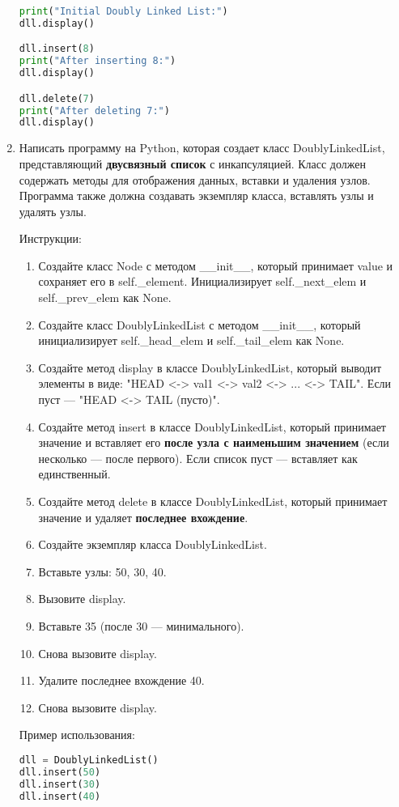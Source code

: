 \begin{enumerate}
\begin{lstlisting}[language=Python]
print("Initial Doubly Linked List:")
dll.display()

dll.insert(8)
print("After inserting 8:")
dll.display()

dll.delete(7)
print("After deleting 7:")
dll.display()
\end{lstlisting}

\item Написать программу на Python, которая создает класс DoublyLinkedList, представляющий \textbf{двусвязный список} с инкапсуляцией. Класс должен содержать методы для отображения данных, вставки и удаления узлов. Программа также должна создавать экземпляр класса, вставлять узлы и удалять узлы.

Инструкции:
\begin{enumerate}
    \item Создайте класс Node с методом \_\_init\_\_, который принимает value и сохраняет его в self.\_element. Инициализирует self.\_next\_elem и self.\_prev\_elem как None.
    \item Создайте класс DoublyLinkedList с методом \_\_init\_\_, который инициализирует self.\_head\_elem и self.\_tail\_elem как None.
    \item Создайте метод display в классе DoublyLinkedList, который выводит элементы в виде: "HEAD <-> val1 <-> val2 <-> ... <-> TAIL". Если пуст — "HEAD <-> TAIL (пусто)".
    \item Создайте метод insert в классе DoublyLinkedList, который принимает значение и вставляет его \textbf{после узла с наименьшим значением} (если несколько — после первого). Если список пуст — вставляет как единственный.
    \item Создайте метод delete в классе DoublyLinkedList, который принимает значение и удаляет \textbf{последнее вхождение}.
    \item Создайте экземпляр класса DoublyLinkedList.
    \item Вставьте узлы: 50, 30, 40.
    \item Вызовите display.
    \item Вставьте 35 (после 30 — минимального).
    \item Снова вызовите display.
    \item Удалите последнее вхождение 40.
    \item Снова вызовите display.
\end{enumerate}

Пример использования:
\begin{lstlisting}[language=Python]
dll = DoublyLinkedList()
dll.insert(50)
dll.insert(30)
dll.insert(40)


\end{lstlisting}
\end{enumerate}
